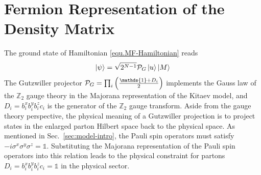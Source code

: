 \section{Fermion Representation of the Density Matrix}\label{appendix:Majorana-derivation}

The ground state of Hamiltonian \eqref{equ.MF-Hamiltonian} reads~\cite{Yao-Qi_2010}
\begin{equation}\label{equ.fermion-state}
    \ket{\psi} = \sqrt{2^{N-1}} \mathcal{P}_G\ket{u}\ket{M}
\end{equation}
The Gutzwiller projector $\mathcal{P}_G=\prod_{i}\lr{\frac{\mathds{1}+D_i}{2}}$ implements the Gauss law of the $\mathbb{Z}_2$ gauge theory in the Majorana representation of the Kitaev model, and $D_i = b^x_ib^y_ib^z_i c_i$ is the generator of the $\mathbb{Z}_2$ gauge transform. {Aside from the gauge theory perspective, the physical meaning of a Gutzwiller projection is to project states in the enlarged parton Hilbert space back to the physical space. As mentioned in Sec.~\ref{sec:model-intro}, the Pauli spin operators must satisfy $-i\sigma^x\sigma^y\sigma^z = \mathds{1}$. Substituting the Majorana representation of the Pauli spin operators into this relation leads to the physical constraint for partons $D_i = b^x_ib^y_ib^z_i c_i = \mathds{1}$ in the physical sector.} 

